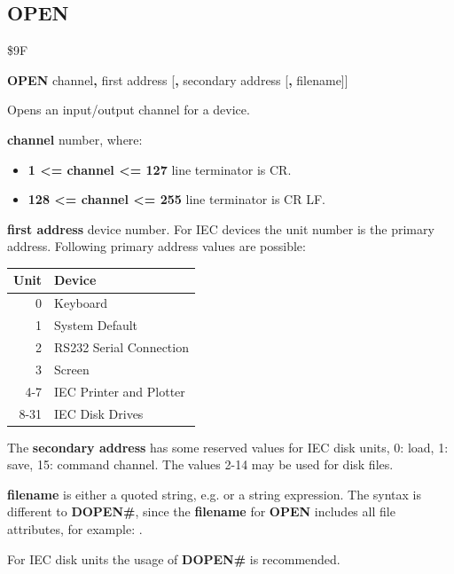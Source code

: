 
\newpage
\subsection{OPEN}
\begin{description}[leftmargin=2cm,style=nextline]
\item [Token:] \$9F
\item [Format:] {\bf OPEN} channel{\bf,} first address
		[{\bf,} secondary address [{\bf,} filename]]
\item [Usage:]
   Opens an input/output channel for a device.

    {\bf channel} number, where:
    \begin{itemize}
        \item {\bf 1 <= channel <= 127} line terminator is CR.
        \item {\bf 128 <= channel <= 255} line terminator is CR LF.
    \end{itemize}

   {\bf first address} device number.
   For IEC devices the unit number is the primary address.
   Following primary address values are possible:

\begin{center}
{\setlength{\tabcolsep}{1mm}
\begin{tabular}{|r|l|}
\hline
{\bf Unit}  & {\bf Device} \\
\hline
0    & Keyboard \\
1    & System Default \\
2    & RS232 Serial Connection \\
3    & Screen \\
4-7  & IEC Printer and Plotter \\
8-31 & IEC Disk Drives \\
\hline
\end{tabular}
}
\end{center}

   The {\bf secondary address} has some reserved values for
   IEC disk units, 0: load, 1: save, 15: command channel.
   The values 2-14 may be used for disk files.

   {\bf filename} is either a quoted string, e.g.  or
   a string expression. The syntax is different to {\bf DOPEN\#},
   since the {\bf filename} for {\bf OPEN} includes all
   file attributes, for example: .

\item [Remarks:]
   For IEC disk units the usage of {\bf DOPEN\#} is recommended.


\end{description}
